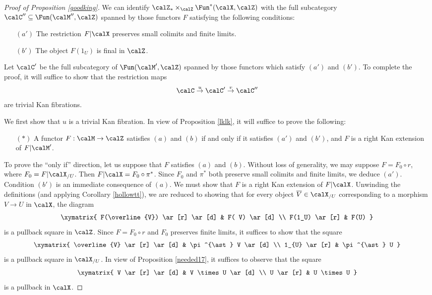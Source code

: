 \begin{proof}[Proof of Proposition \ref{goodking}]
We can identify $\calZ_{\ast} \times_{ \calZ} \Fun^{\ast}(\calX, \calZ)$ with the full subcategory
$\calC'' \subseteq \Fun( \calM'', \calZ)$ spanned by those functors $F$ satisfying the following conditions:
\begin{itemize}
\item[$(a')$] The restriction $F| \calX$ preserves small colimits and finite limits.
\item[$(b')$] The object $F( 1_{U} )$ is final in $\calZ$.  
\end{itemize}
Let $\calC'$ be the full subcategory of $\Fun( \calM', \calZ)$ spanned by those functors which
satisfy $(a')$ and $(b')$. To complete the proof, it will suffice to show that the restriction maps
$$ \calC \stackrel{u}{\rightarrow} \calC' \stackrel{v}{\rightarrow} \calC''$$
are trivial Kan fibrations.

We first show that $u$ is a trivial Kan fibration. In view of Proposition \ref{lklk}, it will suffice to prove the following:
\begin{itemize}
\item[$(\ast)$] A functor $F: \calM \rightarrow \calZ$ satisfies $(a)$ and $(b)$ if and only if
it satisfies $(a')$ and $(b')$, and $F$ is a right Kan extension of $F | \calM'$.
\end{itemize}
To prove the ``only if'' direction, let us suppose that $F$ satisfies $(a)$ and $(b)$. Without loss
of generality, we may suppose $F = F_0 \circ r$, where $F_0 = F | \calX_{/U}$. Then 
$F | \calX = F_0 \circ \pi^{\ast}$. Since $F_0$ and $\pi^{\ast}$ both 
preserve small colimits and finite limits, we deduce $(a')$. Condition $(b')$ is an immediate
consequence of $(a)$. We must show that $F$ is a right Kan extension of $F | \calX$.
Unwinding the definitions (and applying Corollary \ref{hollowtt}), we are reduced to showing that for every object $\overline{V} \in \calX_{/U}$ corresponding to a morphism $V \rightarrow U$ in $\calX$, the diagram
$$ \xymatrix{ F(\overline{V}) \ar[r] \ar[d] & F( V) \ar[d] \\
F(1_U) \ar[r] & F(U) }$$
is a pullback square in $\calZ$. Since $F = F_0 \circ r$ and $F_0$ preserves finite limits,
it suffices to show that the square
$$ \xymatrix{ \overline{V} \ar[r] \ar[d] & \pi^{\ast} V \ar[d] \\
1_{U} \ar[r] & \pi^{\ast} U }$$
is a pullback square in $\calX_{/U}$. In view of Proposition \ref{needed17}, it suffices
to observe that the square
$$ \xymatrix{ V \ar[r] \ar[d] & V \times U \ar[d] \\
U \ar[r] & U \times U }$$
is a pullback in $\calX$.


\end{proof}
